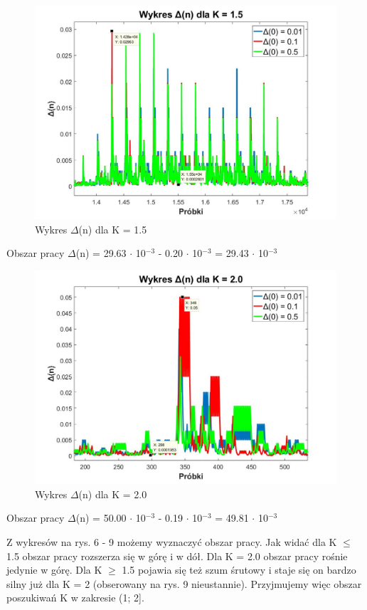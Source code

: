 \documentclass[12pt, a4paper, oneside]{article}
\begin{document}
\clearpage
\begin{figure}[h]
\centering
\caption{Wykres $\Delta$(n) dla K = 1.5}
\includegraphics[scale=0.33]{f7.jpg}
\end{figure}
\begin{center}
Obszar pracy $\Delta$(n) = 29.63 $\cdot$ 10$^{-3}$ - 0.20 $\cdot$ 10$^{-3}$ = 29.43 $\cdot$ 10$^{-3}$
\end{center}
\begin{figure}[h]
\centering
\caption{Wykres $\Delta$(n) dla K = 2.0}
\includegraphics[scale=0.33]{f8.jpg}
\end{figure}
\begin{center}
Obszar pracy $\Delta$(n) = 50.00 $\cdot$ 10$^{-3}$ - 0.19 $\cdot$ 10$^{-3}$ = 49.81 $\cdot$ 10$^{-3}$
\end{center}
\indent\indent Z wykresów na rys. 6 - 9 możemy wyznaczyć obszar pracy. Jak widać dla K $\leq$ 1.5 obszar pracy rozszerza się w górę i w dół. Dla K = 2.0 obszar pracy rośnie jedynie w górę. Dla K $\geq$ 1.5 pojawia się też szum śrutowy i staje się on bardzo silny już dla K = 2 (obserowany na rys. 9 nieustannie). Przyjmujemy więc obszar poszukiwań K w zakresie (1; 2].
\clearpage
\end{document}
